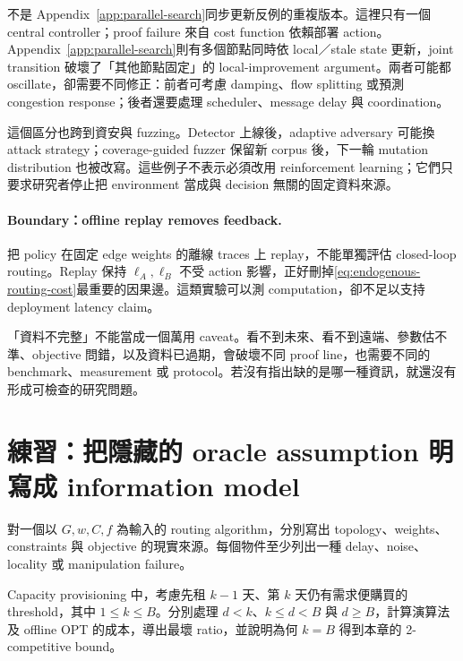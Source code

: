 \documentclass[11pt,a4paper,oneside,openany]{book}
\begin{document}
不是 Appendix~\ref{app:parallel-search}同步更新反例的重複版本。這裡只有一個 central controller；proof failure 來自 cost function 依賴部署 action。Appendix~\ref{app:parallel-search}則有多個節點同時依 local／stale state 更新，joint transition 破壞了「其他節點固定」的 local-improvement argument。兩者可能都 oscillate，卻需要不同修正：前者可考慮 damping、flow splitting 或預測 congestion response；後者還要處理 scheduler、message delay 與 coordination。

這個區分也跨到資安與 fuzzing。Detector 上線後，adaptive adversary 可能換 attack strategy；coverage-guided fuzzer 保留新 corpus 後，下一輪 mutation distribution 也被改寫。這些例子不表示必須改用 reinforcement learning；它們只要求研究者停止把 environment 當成與 decision 無關的固定資料來源。

\paragraph{Boundary：offline replay removes feedback.}
把 policy 在固定 edge weights 的離線 traces 上 replay，不能單獨評估 closed-loop routing。Replay 保持 $\ell_A,\ell_B$ 不受 action 影響，正好刪掉\cref{eq:endogenous-routing-cost}最重要的因果邊。這類實驗可以測 computation，卻不足以支持 deployment latency claim。

\begin{misconception}
「資料不完整」不能當成一個萬用 caveat。看不到未來、看不到遠端、參數估不準、objective 問錯，以及資料已過期，會破壞不同 proof line，也需要不同的 benchmark、measurement 或 protocol。若沒有指出缺的是哪一種資訊，就還沒有形成可檢查的研究問題。
\end{misconception}

\section{練習：把隱藏的 oracle assumption 明寫成 information model}

\begin{exercise}
對一個以 $G,w,C,f$ 為輸入的 routing algorithm，分別寫出 topology、weights、constraints 與 objective 的現實來源。每個物件至少列出一種 delay、noise、locality 或 manipulation failure。
\end{exercise}

\begin{exercise}
Capacity provisioning 中，考慮先租 $k-1$ 天、第 $k$ 天仍有需求便購買的 threshold，其中 $1\le k\le B$。分別處理 $d<k$、$k\le d<B$ 與 $d\ge B$，計算演算法及 offline OPT 的成本，導出最壞 ratio，並說明為何 $k=B$ 得到本章的 2-competitive bound。
\end{exercise}
\end{document}

